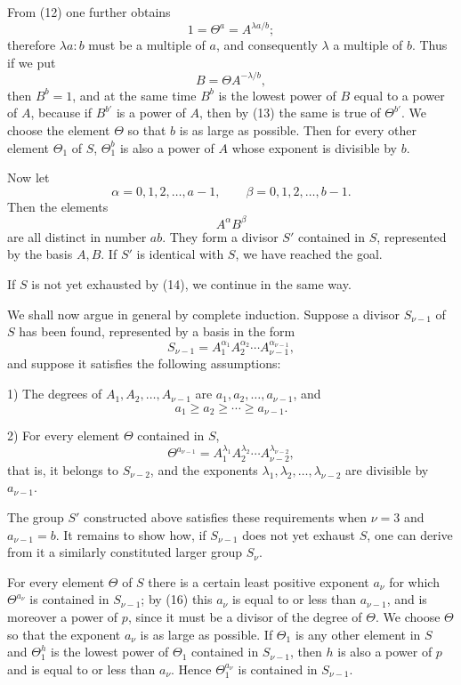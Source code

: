 \documentclass[11pt]{article}
\begin{document}
From (12) one further obtains
\[
1=\Theta^a=A^{\lambda a/b};
\]
therefore $\lambda a:b$ must be a multiple of $a$, and consequently $\lambda$ a multiple of $b$. Thus if we put
\begin{equation}
B=\Theta A^{-\lambda/b},
\tag{13}
\end{equation}
then $B^b=1$, and at the same time $B^b$ is the lowest power of $B$ equal to a power of $A$, because if $B^{b'}$ is a power of $A$, then by (13) the same is true of $\Theta^{b'}$. We choose the element $\Theta$ so that $b$ is as large as possible. Then for every other element $\Theta_1$ of $S$, $\Theta_1^b$ is also a power of $A$ whose exponent is divisible by $b$.

Now let
\[
\alpha=0,1,2,\ldots,a-1,
\qquad
\beta=0,1,2,\ldots,b-1.
\]
Then the elements
\begin{equation}
A^\alpha B^\beta
\tag{14}
\end{equation}
are all distinct in number $ab$. They form a divisor $S'$ contained in $S$, represented by the basis $A,B$. If $S'$ is identical with $S$, we have reached the goal.

If $S$ is not yet exhausted by (14), we continue in the same way.

We shall now argue in general by complete induction. Suppose a divisor $S_{\nu-1}$ of $S$ has been found, represented by a basis in the form
\begin{equation}
S_{\nu-1}=A_1^{\alpha_1}A_2^{\alpha_2}\cdots A_{\nu-1}^{\alpha_{\nu-1}},
\tag{15}
\end{equation}
and suppose it satisfies the following assumptions:

1) The degrees of $A_1,A_2,
\ldots,A_{\nu-1}$ are $a_1,a_2,
\ldots,a_{\nu-1}$, and
\[
a_1\ge a_2\ge\cdots\ge a_{\nu-1}.
\]

2) For every element $\Theta$ contained in $S$,
\begin{equation}
\Theta^{a_{\nu-1}}=A_1^{\lambda_1}A_2^{\lambda_2}\cdots A_{\nu-2}^{\lambda_{\nu-2}},
\tag{16}
\end{equation}
that is, it belongs to $S_{\nu-2}$, and the exponents $\lambda_1,\lambda_2,
\ldots,
\lambda_{\nu-2}$ are divisible by $a_{\nu-1}$.

The group $S'$ constructed above satisfies these requirements when $\nu=3$ and $a_{\nu-1}=b$. It remains to show how, if $S_{\nu-1}$ does not yet exhaust $S$, one can derive from it a similarly constituted larger group $S_\nu$.

For every element $\Theta$ of $S$ there is a certain least positive exponent $a_\nu$ for which $\Theta^{a_\nu}$ is contained in $S_{\nu-1}$; by (16) this $a_\nu$ is equal to or less than $a_{\nu-1}$, and is moreover a power of $p$, since it must be a divisor of the degree of $\Theta$. We choose $\Theta$ so that the exponent $a_\nu$ is as large as possible. If $\Theta_1$ is any other element in $S$ and $\Theta_1^h$ is the lowest power of $\Theta_1$ contained in $S_{\nu-1}$, then $h$ is also a power of $p$ and is equal to or less than $a_\nu$. Hence $\Theta_1^{a_\nu}$ is contained in $S_{\nu-1}$.
\end{document}
